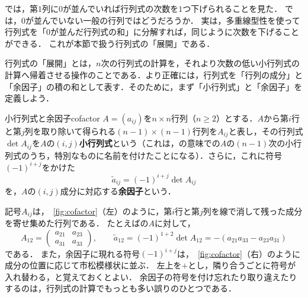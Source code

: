 では，第$1$列に$0$が並んでいれば行列式の次数を$1$つ下げられることを見た．
では，$0$が並んでいない一般の行列ではどうだろうか．
実は，多重線型性を使って行列式を「$0$が並んだ行列式の和」に分解すれば，同じように次数を下げることができる．
これが本節で扱う行列式の「展開」である．

行列式の「展開」とは，$n$次の行列式の計算を，それより次数の低い小行列式の計算へ帰着させる操作のことである．より正確には，行列式を「行列の成分」と「余因子」の積の和として表す．そのために，まず「小行列式」と「余因子」を定義しよう．

\begin{definition}{小行列式と余因子}{cofactor}
  $A = (a_{ij})$を$n \times n$行列（$n \geq 2$）とする．$A$から第$i$行と第$j$列を取り除いて得られる$(n-1) \times (n-1)$行列を$A_{ij}$と表し，その行列式$\det A_{ij}$を$A$の$(i,j)$\textbf{小行列式}という（これは，の意味での$A$の$(n-1)$次の小行列式のうち，特別なものに名前を付けたことになる）．さらに，これに符号$(-1)^{i+j}$をかけた
  \[
  \tilde{a}_{ij} = (-1)^{i+j} \det A_{ij}
  \]
  を，$A$の$(i,j)$成分に対応する\textbf{余因子}という．
\end{definition}

記号$A_{ij}$は，\figurename~\ref{fig:cofactor}（左）のように，第$i$行と第$j$列を線で消して残った成分を寄せ集めた行列である．
たとえばの$A$に対して，
\[
  A_{12} = \begin{pmatrix} a_{21} & a_{23} \\ a_{31} & a_{33} \end{pmatrix}, \qquad
  \tilde{a}_{12} = (-1)^{1+2}\det A_{12} = -(a_{21}a_{33} - a_{23}a_{31})
\]
である．
また，余因子に現れる符号$(-1)^{i+j}$は，\figurename~\ref{fig:cofactor}（右）のように成分の位置に応じて市松模様状に並ぶ．
左上を$+$とし，隣り合うごとに符号が入れ替わる，と覚えておくとよい．
余因子の符号を付け忘れたり取り違えたりするのは，行列式の計算でもっとも多い誤りのひとつである．

